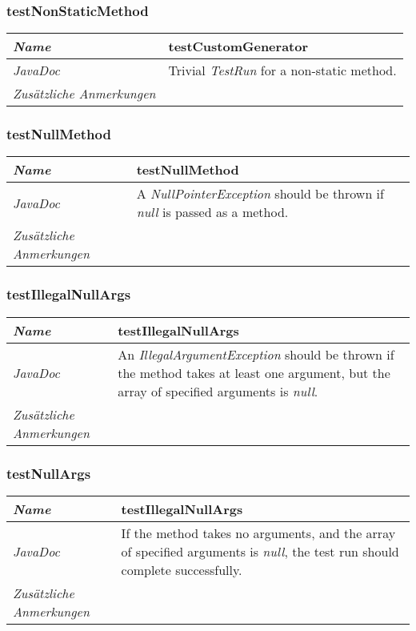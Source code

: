 \documentclass[a4paper]{report}
\begin{document}
\subsubsection{testNonStaticMethod}
\begin{tabular}{p{2.3cm}  p{11.5cm}}
  \hline
 \textit{Name} & testCustomGenerator\\
  \hline
 \textit{JavaDoc} & Trivial \emph{TestRun} for a non-static method. \\
  \hline
 \textit{Zusätzliche Anmerkungen} & \\
  \hline
\end{tabular}

\subsubsection{testNullMethod}
\begin{tabular}{p{2.3cm}  p{11.5cm}}
  \hline
 \textit{Name} & testNullMethod\\
  \hline
 \textit{JavaDoc} & A \emph{NullPointerException} should be thrown if \emph{null} is passed as a method.\\
  \hline
 \textit{Zusätzliche Anmerkungen} & \\
  \hline
\end{tabular}

\subsubsection{testIllegalNullArgs}
\begin{tabular}{p{2.3cm}  p{11.5cm}}
  \hline
 \textit{Name} & testIllegalNullArgs\\
  \hline
 \textit{JavaDoc} & An \emph{IllegalArgumentException} should be thrown if the method takes at least one argument, but the array of specified arguments is \emph{null}.\\
  \hline
 \textit{Zusätzliche Anmerkungen} & \\
  \hline
\end{tabular}

\subsubsection{testNullArgs}
\begin{tabular}{p{2.3cm}  p{11.5cm}}
  \hline
 \textit{Name} & testIllegalNullArgs\\
  \hline
 \textit{JavaDoc} & If the method takes no arguments, and the array of specified arguments is \emph{null}, the test run should complete successfully. \\
  \hline
 \textit{Zusätzliche Anmerkungen} & \\
  \hline
\end{tabular}
\end{document}
